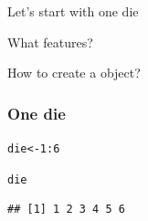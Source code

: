 \documentclass[12pt]{beamer}\usepackage[]{graphicx}\usepackage[]{color}
\makeatletter
\newcommand{\hlnum}[1]{\textcolor[rgb]{0.686,0.059,0.569}{#1}}%
\newcommand{\hlopt}[1]{\textcolor[rgb]{0,0,0}{#1}}%
\newcommand{\hlstd}[1]{\textcolor[rgb]{0.345,0.345,0.345}{#1}}%
\newcommand{\hlkwb}[1]{\textcolor[rgb]{0.69,0.353,0.396}{#1}}%
\newenvironment{kframe}{%
 \def\at@end@of@kframe{}%
 \ifinner\ifhmode%
  \def\at@end@of@kframe{\end{minipage}}%
  \begin{minipage}{\columnwidth}%
 \fi\fi%
 \def\FrameCommand##1{\hskip\@totalleftmargin \hskip-\fboxsep
 \colorbox{shadecolor}{##1}\hskip-\fboxsep
     \hskip-\linewidth \hskip-\@totalleftmargin \hskip\columnwidth}%
 \MakeFramed {\advance\hsize-\width
   \@totalleftmargin\z@ \linewidth\hsize
   \@setminipage}}%
 {\par\unskip\endMakeFramed%
 \at@end@of@kframe}
\newenvironment{knitrout}{}{} %
\makeatother
\begin{document}

\begin{frame}
\begin{center}
\Huge{}
\end{center}
\end{frame}


\begin{frame}[fragile]
\frametitle{}
\begin{center}
\end{center}

\bi
  \item Let's start with one die
  \item What features?
  \item How to create a {\hilit {}} object?
\ei

\end{frame}


\begin{frame}[fragile]
\frametitle{One die}

\begin{knitrout}\footnotesize
{}\color{fgcolor}\begin{kframe}
\begin{alltt}
\hlstd{die} \hlkwb{<-} \hlnum{1}\hlopt{:}\hlnum{6}

\hlstd{die}
\end{alltt}
\begin{verbatim}
## [1] 1 2 3 4 5 6
\end{verbatim}
\end{kframe}
\end{knitrout}

\end{frame}

\end{document}
